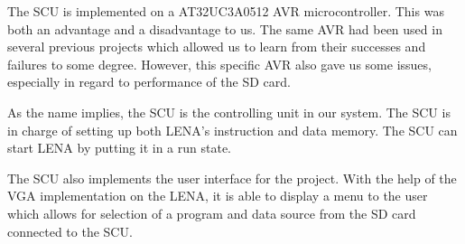 The \acf{SCU} is implemented on a AT32UC3A0512 AVR microcontroller. This was both an advantage and a disadvantage to us. The same AVR had been used in several previous projects which allowed us to learn from their successes and failures to some degree. However, this specific AVR also gave us some issues, especially in regard to performance of the \ac{SD} card.

As the name implies, the \ac{SCU} is the controlling unit in
our system. The \ac{SCU} is in charge of setting up both \ac{LENA}'s instruction
and data memory. The \ac{SCU} can start \ac{LENA} by putting it in a run state.

The \ac{SCU} also implements the user interface for the project. With the help
of the \ac{VGA} implementation on the \ac{LENA}, it is able to display a menu to
the user which allows for selection of a program and data source from the \ac{SD}
card connected to the \ac{SCU}.
